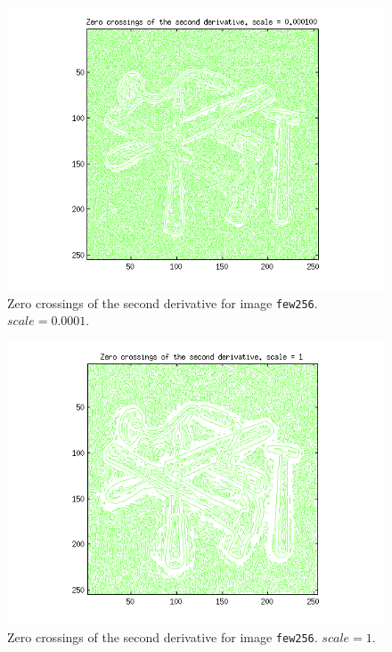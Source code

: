 \begin{figure}[H]
	\centering
	\includegraphics[scale=0.8]{./images/Q5/vv/0.0001.png}
	\caption{Zero crossings of the second derivative for image \texttt{few256}. $scale = 0.0001$.}
	\label{fig:Q5_vv_0.0001}
\end{figure}

\begin{figure}[H]
	\centering
	\includegraphics[scale=0.8]{./images/Q5/vv/1.png}
	\caption{Zero crossings of the second derivative for image \texttt{few256}. $scale = 1$.}
	\label{fig:Q5_vv_1}
\end{figure}

